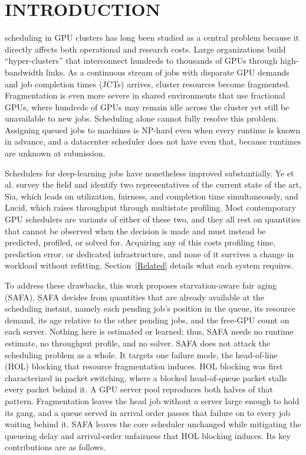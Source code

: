 \documentclass{ieeetj}
\begin{document}
\maketitle


\section{INTRODUCTION}\label{sec1}
 scheduling in GPU clusters has long been studied as a central problem because it directly affects both operational and research costs. Large organizations build ``hyper-clusters'' that interconnect hundreds to thousands of GPUs through high-bandwidth links. As a continuous stream of jobs with disparate GPU demands and job completion times (JCTs) arrives, cluster resources become fragmented\cite{athlur2022varuna}. Fragmentation is even more severe in shared environments that use fractional GPUs, where hundreds of GPUs may remain idle across the cluster yet still be unavailable to new jobs\cite{weng2023beware}. Scheduling alone cannot fully resolve this problem. Assigning queued jobs to machines is NP-hard even when every runtime is known in advance\cite{ullman1975np,b1}, and a datacenter scheduler does not have even that, because runtimes are unknown at submission\cite{b2}.

Schedulers for deep-learning jobs have nonetheless improved substantially. Ye et al.\cite{b3} survey the field and identify two representatives of the current state of the art, Sia\cite{b4}, which leads on utilization, fairness, and completion time simultaneously, and Lucid\cite{b5}, which raises throughput through multistate profiling. Most contemporary GPU schedulers are variants of either of these two, and they all rest on quantities that cannot be observed when the decision is made and must instead be predicted, profiled, or solved for. Acquiring any of this costs profiling time, prediction error, or dedicated infrastructure, and none of it survives a change in workload without refitting. Section~\ref{Related} details what each system requires.

To address these drawbacks, this work proposes starvation-aware fair aging (SAFA). SAFA decides from quantities that are already available at the scheduling instant, namely each pending job's position in the queue, its resource demand, its age relative to the other pending jobs, and the free-GPU count on each server. Nothing here is estimated or learned; thus, SAFA needs no runtime estimate, no throughput profile, and no solver. SAFA does not attack the scheduling problem as a whole. It targets one failure mode, the head-of-line (HOL) blocking\cite{karol1987hol} that resource fragmentation induces. HOL blocking was first characterized in packet switching, where a blocked head-of-queue packet stalls every packet behind it. A GPU server pool reproduces both halves of that pattern. Fragmentation leaves the head job without a server large enough to hold its gang, and a queue served in arrival order passes that failure on to every job waiting behind it. SAFA leaves the core scheduler unchanged while mitigating the queueing delay and arrival-order unfairness that HOL blocking induces. Its key contributions are as follows.
\end{document}
